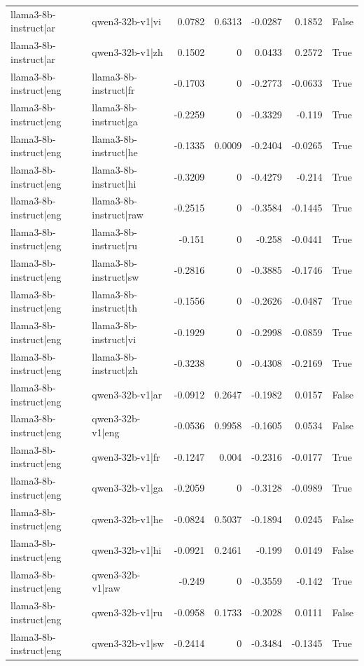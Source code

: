 \begin{table}
\begin{tabular}{l l r r r r l}
llama3-8b-instruct|ar & qwen3-32b-v1|vi & 0.0782 & 0.6313 & -0.0287 & 0.1852 & False \\
llama3-8b-instruct|ar & qwen3-32b-v1|zh & 0.1502 & 0 & 0.0433 & 0.2572 & True \\
llama3-8b-instruct|eng & llama3-8b-instruct|fr & -0.1703 & 0 & -0.2773 & -0.0633 & True \\
llama3-8b-instruct|eng & llama3-8b-instruct|ga & -0.2259 & 0 & -0.3329 & -0.119 & True \\
llama3-8b-instruct|eng & llama3-8b-instruct|he & -0.1335 & 0.0009 & -0.2404 & -0.0265 & True \\
llama3-8b-instruct|eng & llama3-8b-instruct|hi & -0.3209 & 0 & -0.4279 & -0.214 & True \\
llama3-8b-instruct|eng & llama3-8b-instruct|raw & -0.2515 & 0 & -0.3584 & -0.1445 & True \\
llama3-8b-instruct|eng & llama3-8b-instruct|ru & -0.151 & 0 & -0.258 & -0.0441 & True \\
llama3-8b-instruct|eng & llama3-8b-instruct|sw & -0.2816 & 0 & -0.3885 & -0.1746 & True \\
llama3-8b-instruct|eng & llama3-8b-instruct|th & -0.1556 & 0 & -0.2626 & -0.0487 & True \\
llama3-8b-instruct|eng & llama3-8b-instruct|vi & -0.1929 & 0 & -0.2998 & -0.0859 & True \\
llama3-8b-instruct|eng & llama3-8b-instruct|zh & -0.3238 & 0 & -0.4308 & -0.2169 & True \\
llama3-8b-instruct|eng & qwen3-32b-v1|ar & -0.0912 & 0.2647 & -0.1982 & 0.0157 & False \\
llama3-8b-instruct|eng & qwen3-32b-v1|eng & -0.0536 & 0.9958 & -0.1605 & 0.0534 & False \\
llama3-8b-instruct|eng & qwen3-32b-v1|fr & -0.1247 & 0.004 & -0.2316 & -0.0177 & True \\
llama3-8b-instruct|eng & qwen3-32b-v1|ga & -0.2059 & 0 & -0.3128 & -0.0989 & True \\
llama3-8b-instruct|eng & qwen3-32b-v1|he & -0.0824 & 0.5037 & -0.1894 & 0.0245 & False \\
llama3-8b-instruct|eng & qwen3-32b-v1|hi & -0.0921 & 0.2461 & -0.199 & 0.0149 & False \\
llama3-8b-instruct|eng & qwen3-32b-v1|raw & -0.249 & 0 & -0.3559 & -0.142 & True \\
llama3-8b-instruct|eng & qwen3-32b-v1|ru & -0.0958 & 0.1733 & -0.2028 & 0.0111 & False \\
llama3-8b-instruct|eng & qwen3-32b-v1|sw & -0.2414 & 0 & -0.3484 & -0.1345 & True \\

\end{tabular}
\end{table}
